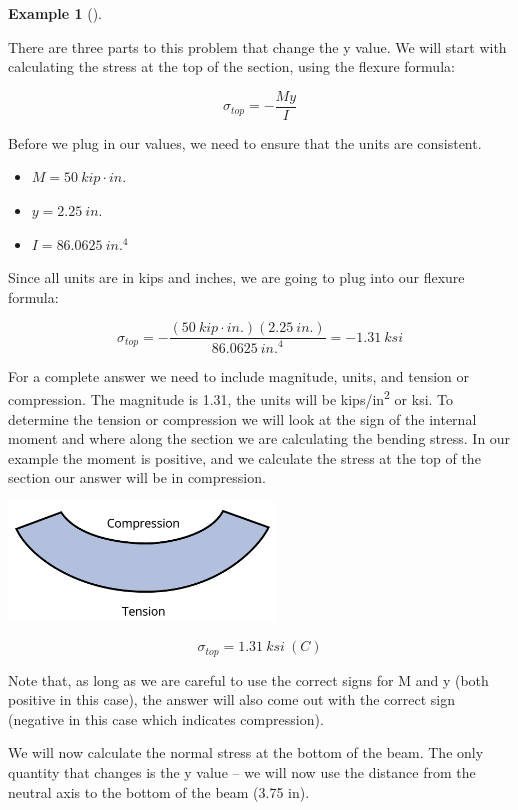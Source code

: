 \documentclass[
  letterpaper,
  DIV=11,
  numbers=noendperiod]{scrreprt}
\theoremstyle{definition}
\newtheorem{example}{Example}[chapter]
\theoremstyle{remark}
\begin{document}
\begin{tcolorbox}
\begin{example}[]
\begin{tcolorbox}
There are three parts to this problem that change the y value. We will
start with calculating the stress at the top of the section, using the
flexure formula:

\[
\sigma_{t o p}=-\frac{M y}{I}
\]

Before we plug in our values, we need to ensure that the units are
consistent.

\begin{itemize}
\item
  \(M = 50{~kip}\cdot{in.}\)
\item
  \(y = 2.25{~in.}\)
\item
  \(I = 86.0625{~in.^4}\)
\end{itemize}

Since all units are in kips and inches, we are going to plug into our
flexure formula:

\[
\sigma_{top}=-\frac{(50{~kip}\cdot{in.})(2.25{~in.})}{86.0625{~in.}^4}=-1.31{~ksi}
\]

For a complete answer we need to include magnitude, units, and tension
or compression. The magnitude is 1.31, the units will be
kips/in\textsuperscript{2} or ksi. To determine the tension or
compression we will look at the sign of the internal moment and where
along the section we are calculating the bending stress. In our example
the moment is positive, and we calculate the stress at the top of the
section our answer will be in compression.

\begin{center}
\includegraphics[width=2.79167in,height=\textheight]{images/CH9 PNGs/Example 9.1 part 4.png}
\end{center}

\[
\sigma_{top}=1.31{~ksi}~(C)
\]

Note that, as long as we are careful to use the correct signs for M and
y (both positive in this case), the answer will also come out with the
correct sign (negative in this case which indicates compression).

We will now calculate the normal stress at the bottom of the beam. The
only quantity that changes is the y value -- we will now use the
distance from the neutral axis to the bottom of the beam (3.75 in).


\end{tcolorbox}
\end{example}
\end{tcolorbox}
\end{document}
